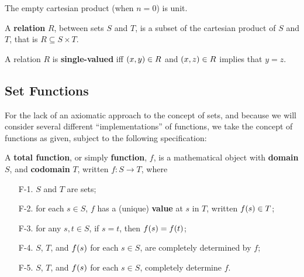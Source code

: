\begin{remark} The empty cartesian product (when $n=0$) is unit. \end{remark} 


\begin{definition} A \textbf{relation} $R$, between sets $S$ and $T$, is a
subset of the cartesian product of $S$ and $T$, that is $R \subseteq S\times
T$. \end{definition}


\begin{definition} A relation $R$ is \textbf{single-valued} iff $\mathopen{}\left({x,y}\right)\mathclose{}\in R$
and $\mathopen{}\left({x,z}\right)\mathclose{}\in R$ implies that $y=z$. \end{definition}

\subsection{Set Functions}

For the lack of an axiomatic approach to the concept of sets, and because we
will consider several different ``implementations'' of functions, we take the
concept of functions as given, subject to the following specification:

\begin{specification} \label{spec:function} A \textbf{total function}, or
simply \textbf{function}, $f$, is a mathematical object with \textbf{domain}
$S$, and \textbf{codomain} $T$, written $f : S\rightarrow T$, where

\begin{enumerate}

\item [F-1.] $S$ and $T$ are sets;

\item [F-2.] for each $s \in S$, $f$ has a (unique) \textbf{value} at $s$ in
$T$, written $f\mathopen{}\left({s}\right)\mathclose{}\in T$;

\item [F-3.] for any $s,t \in S$, if $s = t$, then $f\mathopen{}\left({s}\right)\mathclose{} = f\mathopen{}\left({t}\right)\mathclose{}$;

\item [F-4.] $S$, $T$, and $f\mathopen{}\left({s}\right)\mathclose{}$ for each $s \in S$, are completely
determined by $f$;

\item [F-5.] $S$, $T$, and $f\mathopen{}\left({s}\right)\mathclose{}$ for each $s \in S$, completely determine
$f$.

\end{enumerate}

\end{specification}

